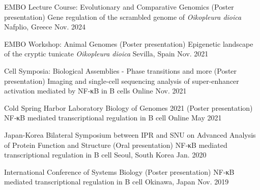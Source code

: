 



\begin{cventries}

  \cventrypub
    {EMBO Lecture Course: Evolutionary and Comparative Genomics
    (Poster presentation)} %
    {Gene regulation of the scrambled genome of \textit{Oikopleura dioica}} %
    {Nafplio, Greece} %
    {Nov. 2024} %

  \cventrypub
    {EMBO Workshop: Animal Genomes (Poster presentation)} %
    {Epigenetic landscape of the cryptic tunicate \textit{Oikopleura dioica}} %
    {Sevilla, Spain} %
    {Nov. 2021} %

  \cventrypub
    {Cell Symposia: Biological Assemblies - Phase transitions and more (Poster presentation)} %
    {Imaging and single-cell sequencing analysis of super-enhancer activation mediated by NF-κB in B cells} %
    {Online} %
    {Nov. 2021} %

  \cventrypub
    {Cold Spring Harbor Laboratory Biology of Genomes 2021 (Poster presentation)} %
    {NF‑κB mediated transcriptional regulation in B cell} %
    {Online} %
    {May 2021} %

  \cventrypub
    {Japan-Korea Bilateral Symposium between IPR and SNU on Advanced Analysis of Protein Function and Structure (Oral presentation)} %
    {NF‑κB mediated transcriptional regulation in B cell} %
    {Seoul, South Korea} %
    {Jan. 2020} %

  \cventrypublast
    {International Conference of Systems Biology (Poster presentation)} %
    {NF‑κB mediated transcriptional regulation in B cell} %
    {Okinawa, Japan} %
    {Nov. 2019} %
  

\end{cventries}


